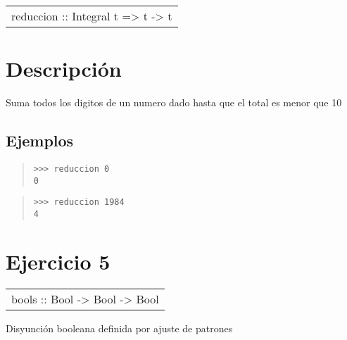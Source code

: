 \begin{haddockdesc}
\item[\begin{tabular}{@{}l}
reduccion :: Integral t => t -> t
\end{tabular}]
{\haddockbegindoc
\section*{Descripción}
Suma todos los digitos de un numero dado hasta que el total es menor que 10\par
\subsection*{Ejemplos}
\begin{quote}
{\haddockverb\begin{verbatim}
>>> reduccion 0
0

\end{verbatim}}
\end{quote}
\begin{quote}
{\haddockverb\begin{verbatim}
>>> reduccion 1984
4

\end{verbatim}}
\end{quote}}
\end{haddockdesc}
\section{Ejercicio 5}
\begin{haddockdesc}
\item[\begin{tabular}{@{}l}
bools :: Bool -> Bool -> Bool
\end{tabular}]
{\haddockbegindoc
Disyunción booleana definida por ajuste de patrones\par}
\end{haddockdesc}